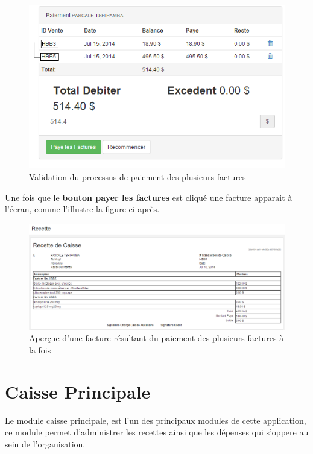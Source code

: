 \documentclass[12pt,a4paper]{report}
\begin{document}
\begin{figure}[h]
\begin{center}
\includegraphics[width=12cm]{pic/PaidDoubleFact.png}
\end{center}
\caption{Validation du processus de paiement des plusieurs factures}
\label{Validation du processus de paiement des plusieurs factures}
\end{figure}
Une fois que le \textbf{bouton payer les factures} est cliqué une facture apparait à l'écran, comme l'illustre la figure ci-après.

\begin{figure}[h]
\begin{center}
\includegraphics[width=14cm]{pic/FactureDoubles.png}
\end{center}
\caption{Aperçue d'une facture résultant du paiement des plusieurs factures à la fois}
\label{Aperçue d'une facture résultant du paiement des plusieurs factures à la fois}
\end{figure}

\newpage 
\section{Caisse Principale}
Le module caisse principale, est l'un des principaux modules de cette application, ce module permet d'administrer les recettes ainsi que les dépenses qui s'oppere au sein de l'organisation.
\end{document}
